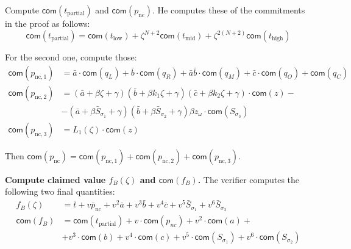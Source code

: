 \documentclass[../lecture-notes.tex]{subfiles}
\begin{document}
Compute $\mathsf{com}(t_{\text{partial}})$ and
$\mathsf{com}(p_{\text{nc}})$. He computes these of the commitments in the
proof as follows:
\begin{equation*}
    \mathsf{com}(t_{\text{partial}}) = \mathsf{com}(t_{\text{low}}) + \zeta^{N+2}\mathsf{com}(t_{\text{mid}}) + \zeta^{2(N+2)}\mathsf{com}(t_{\text{high}})
\end{equation*}

For the second one, compute those:
\begin{equation*}
    \begin{aligned}
        \mathsf{com}(p_{\text{nc},1}) &= \bar{a}\cdot\mathsf{com}(q_L) + \bar{b} \cdot \mathsf{com}(q_R) + \bar{a}\bar{b} \cdot \mathsf{com}(q_M) + \bar{c} \cdot \mathsf{com}(q_O) + \mathsf{com}(q_C) \\
        \mathsf{com}(p_{\text{nc},2}) &= (\bar{a} + \beta \zeta + \gamma)(\bar{b} + \beta k_1 \zeta + \gamma)(\bar{c} + \beta k_2 \zeta + \gamma) \cdot\mathsf{com}(z) - \\ 
                                      &- (\bar{a} + \beta \bar{S}_{\sigma_1} + \gamma)(\bar{b} + \beta \bar{S}_{\sigma_2} + \gamma)\beta z_{\omega}\cdot \mathsf{com}(S_{\sigma_3}) \\
        \mathsf{com}(p_{\text{nc},3}) &= L_1(\zeta)\cdot\mathsf{com}(z)
    \end{aligned}
\end{equation*}

Then $\mathsf{com}(p_{\text{nc}}) = \mathsf{com}(p_{\text{nc},1}) + \mathsf{com}(p_{\text{nc},2}) + \mathsf{com}(p_{\text{nc},3})$.

\textcolor{blue!60!black}{\textbf{Compute claimed value $f_{B}(\zeta)$ and $\mathsf{com}(f_{B})$.}} The verifier computes 
the following two final quantities:
\begin{align*}
f_{B}(\zeta) &= \bar{t} + v \bar{p}_{\text{nc}} + v^2 \bar{a} + v^3 \bar{b} + v^4 \bar{c} + v^5 \bar{S}_{\sigma_1} + v^6 \bar{S}_{\sigma_2} \\
\mathsf{com}(f_{B}) &= \mathsf{com}(t_{\text{partial}}) + v \cdot \mathsf{com}(p_{nc}) + v^2 \cdot \mathsf{com}(a) + \\
&+ v^3 \cdot \mathsf{com}(b) + v^4 \cdot \mathsf{com}(c) + v^5 \cdot \mathsf{com}(S_{\sigma_1}) + v^6 \cdot \mathsf{com}(S_{\sigma_2})
\end{align*}
\end{document}
